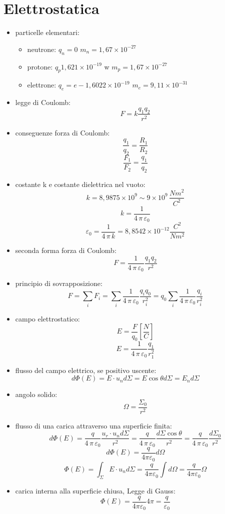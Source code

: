 \documentclass[a4paper,12pt, oneside]{book}
\begin{document}
\section{Elettrostatica}
\begin{itemize}
\item particelle elementari:
\begin{itemize}
\item neutrone: $q_n=0$ $m_n=1,67\times 10^{-27}$
\item protone: $q_p1,621\times 10^{-19}$ w $m_p=1,67\times 10^{-27}$
\item elettrone: $q_e=e-1,6022\times 10^{-19}$ $m_e=9,11\times 10^{-31}$ 
\end{itemize}
\item legge di Coulomb:
$$F=k\frac{q_1q_2}{r^2}$$
\item conseguenze forza di Coulomb:
$$\frac{q_1}{q_2}=\frac{R_1}{R_2}$$
$$\frac{F_1}{F_2}=\frac{q_1}{q_2}$$
\item costante k e costante dielettrica nel vuoto:
$$k=8,9875\times 10^9\sim 9\times 10^9\,\frac{Nm^2}{C^2}$$
$$k=\frac{1}{4\,\pi\,\varepsilon_0}$$
$$\varepsilon_0=\frac{1}{4\,\pi\,k}=8,8542\times 10^{-12}\frac{C^2}{Nm^2}$$
\item seconda forma forza di Coulomb:
$$F=\frac{1}{4\,\pi\,\varepsilon_0}\frac{q_1q_2}{r^2}$$
\item principio di sovrapposizione:
$$F=\sum_i F_i=\sum_i \frac{1}{4\,\pi\,\varepsilon_0}\frac{q_iq_0}{r_i^2}=q_0\sum_i\frac{1}{4\,\pi\,\varepsilon_0}\frac{q_i}{r_i^2}$$
\item campo elettrostatico:
$$E=\frac{F}{q_0}\left[\frac{N}{C}\right]$$
$$E=\frac{1}{4\,\pi\,\varepsilon_0}\frac{q_1}{r_1^2}$$
\item flusso del campo elettrico, se positivo uscente:
$$d\Phi(E)=E\cdot u_nd\Sigma=E\cos \theta d\Sigma=E_nd\Sigma$$
\item angolo solido:
$$\Omega=\frac{\Sigma_0}{r^2}$$
\item flusso di una carica attraverso una superficie finita:
$$d\Phi(E)=\frac{q}{4\,\pi\,\varepsilon_0}\frac{u_r\cdot u_nd\Sigma}{r^2}=\frac{q}{4\,\pi\,\varepsilon_0}\frac{d\Sigma\cos \theta}{r^2}=\frac{q}{4\,\pi\,\varepsilon_0}\frac{d\Sigma_0}{r^2}$$
$$d\Phi(E)=\frac{q}{4\pi\varepsilon_0}d\Omega$$
$$\Phi(E)=\int_\Sigma E\cdot u_nd\Sigma=\frac{q}{4\pi\varepsilon_0}\int d\Omega=\frac{q}{4\pi\varepsilon_0}\Omega$$
\item carica interna alla superficie chiusa, Legge di Gauss:
$$\Phi(E)=\frac{q}{4\pi\varepsilon_0}4\pi=\frac{q}{\varepsilon_0}$$

\end{itemize}
\end{document}
